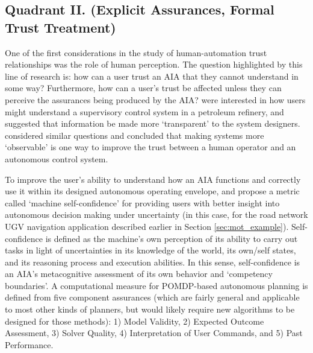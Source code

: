 \subsection{Quadrant II. (Explicit Assurances, Formal Trust Treatment)}\label{sec:q2}
One of the first considerations in the study of human-automation trust relationships was the role of human perception. 
The question highlighted by this line of research is: how can a user trust an AIA that they cannot understand in some way? Furthermore, how can a user's trust be affected unless they can perceive the assurances being produced by the AIA?
\citet{Sheridan1984-kx} were interested in how users might understand a supervisory control system in a petroleum refinery, and suggested that information be made more `transparent' to the system designers. \citet{Muir1987-mk,Muir1994-ow} considered similar questions and concluded that making systems more `observable' is one way to improve the trust between a human operator and an autonomous control system. 

To improve the user's ability to understand how an AIA functions and correctly use it within its designed autonomous operating envelope, \citet{Aitken2016-fb} and \citet{Aitken2016-cv} propose a metric called `machine self-confidence' for providing users with better insight into autonomous decision making under uncertainty (in this case, for the road network UGV navigation application described earlier in Section \ref{sec:mot_example}). 
Self-confidence is defined as the machine's own perception of its ability to carry out tasks in light of uncertainties in its knowledge of the world, its own/self states, and its reasoning process and execution abilities. 
In this sense, self-confidence is an AIA's metacognitive assessment of its own behavior and `competency boundaries'. 
A computational measure for POMDP-based autonomous planning is defined from five component assurances (which are fairly general and applicable to most other kinds of planners, but would likely require new algorithms to be designed for those methods): 1) Model Validity, 2) Expected Outcome Assessment, 3) Solver Quality, 4) Interpretation of User Commands, and 5) Past Performance. 

